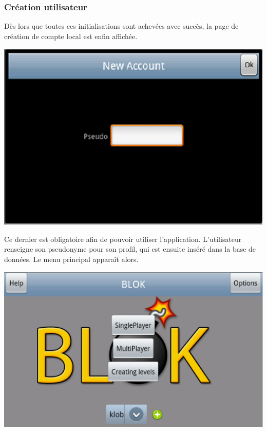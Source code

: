 	\subsubsection{Création utilisateur}
	Dès lors que toutes ces initialisations sont achevées avec succès, la page de
	création de compte local est enfin affichée.
		\begin{center}						
			\includegraphics[scale=0.6]{Developpement/Img/2.eps}
		\end{center} 
	Ce dernier est obligatoire afin de pouvoir utiliser l'application. L'utilisateur renseigne son pseudonyme
	pour son profil, qui est ensuite inséré dans la base de données.
	Le menu principal apparaît alors.
	\begin{center}						
			\includegraphics[scale=0.3]{Developpement/Img/3.eps}
		\end{center} 
	

